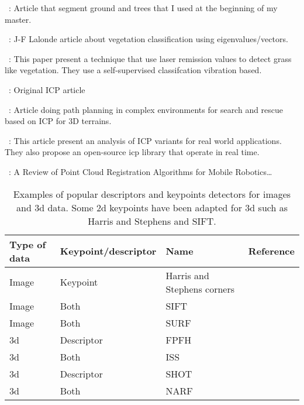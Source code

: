 ~\cite{Mcdaniel2012}:
Article that segment ground and trees that I used at the beginning of my master. 

~\cite{Lalonde2006}:
J-F Lalonde article about vegetation classification using eigenvalues/vectors. 

~\cite{Wurm2009}:
This paper present a technique that use laser remission values to detect grass like vegetation. They use a self-supervised classifcation vibration based. 

~\cite{Besl1992}:
Original ICP article

~\cite{Colas2013}:
Article doing path planning in complex environments for search and rescue based on ICP for 3D terrains. 

~\cite{Pomerleau2013}:
This article present an analysis of ICP variants for real world applications. They also propose an open-source icp library that operate in real time.  

~\cite{Pomerleau2015a}:
A Review of Point Cloud Registration Algorithms for Mobile Robotics\dots


\begin{table}[H]
    \centering
    \begin{tabular}{@{}llll@{}}
        \toprule
        \textbf{Type of data}  & \textbf{Keypoint/descriptor} & \textbf{Name}               & \textbf{Reference} \\
        \hline
        Image                  & Keypoint                     & Harris and Stephens corners & \cite{Harris1988}  \\
        Image                  & Both                         & SIFT                        & \cite{Lowe2004}    \\
        Image                  & Both                         & SURF                        & \cite{Bay2006}     \\
        \gls*{3d}              & Descriptor                   & FPFH                        & \cite{Rusu2009}    \\
        \gls*{3d}              & Both                         & ISS                         & \cite{Yu2009}      \\
        \gls*{3d}              & Descriptor                   & SHOT                        & \cite{Tombari2010} \\
        \gls*{3d}              & Both                         & NARF                        & \cite{Steder2011a} \\
        \bottomrule
    \end{tabular}
    \caption{Examples of popular descriptors and keypoints detectors for images and \gls*{3d} data. Some \gls*{2d} keypoints have been adapted for \gls*{3d} such as Harris and Stephens and SIFT.}
    \label{tab:features_examples}
\end{table}

